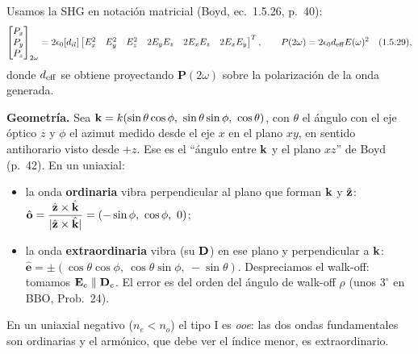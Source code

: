 

\label{sol:35}

Usamos la SHG en notación matricial (Boyd, ec.~1.5.26, p.~40):
\[
\begin{bmatrix}P_x\\P_y\\P_z\end{bmatrix}_{2\omega}=2\epsilon_0[d_{il}]
\begin{bmatrix}E_x^2& E_y^2& E_z^2& 2E_yE_z& 2E_xE_z& 2E_xE_y\end{bmatrix}^{T},
\qquad P(2\omega)=2\epsilon_0d_{\rm eff}E(\omega)^2\quad(1.5.29),
\]
donde $d_{\rm eff}$ se obtiene proyectando $\mathbf P(2\omega)$ sobre la polarización de la onda generada.

 \textbf{Geometría.} Sea $\kv=k(\sin\theta\cos\phi,\ \sin\theta\sin\phi,\ \cos\theta)$, con $\theta$ el ángulo con el eje óptico $z$ y $\phi$
el azimut medido desde el eje $x$ en el plano $xy$, en sentido antihorario visto desde $+z$. Ese es el ``ángulo entre $\mathbf k$ y el plano $xz$''
de Boyd (p.~42). En un uniaxial:
\begin{itemize}
\item la onda \textbf{ordinaria} vibra perpendicular al plano que forman $\mathbf k$ y $\hat{\mathbf z}$:
$\hat{\mathbf o}=\dfrac{\zh\times\hat\kv}{|\zh\times\hat\kv|}=(-\sin\phi,\ \cos\phi,\ 0)$;
\item la onda \textbf{extraordinaria} vibra (su $\mathbf D$) en ese plano y perpendicular a $\mathbf k$: $\hat{\mathbf e}=\pm(\cos\theta\cos\phi,\ \cos\theta\sin\phi,\ -\sin\theta)$.
Despreciamos el walk-off: tomamos $\mathbf E_e\parallel\mathbf D_e$. El error es del orden del ángulo de walk-off $\rho$ (unos $3^\circ$ en BBO, Prob.~24).
\end{itemize}
En un uniaxial negativo ($n_e<n_o$) el tipo I es \emph{ooe}: las dos ondas fundamentales son ordinarias y el armónico, que debe ver el
índice menor, es extraordinario.

